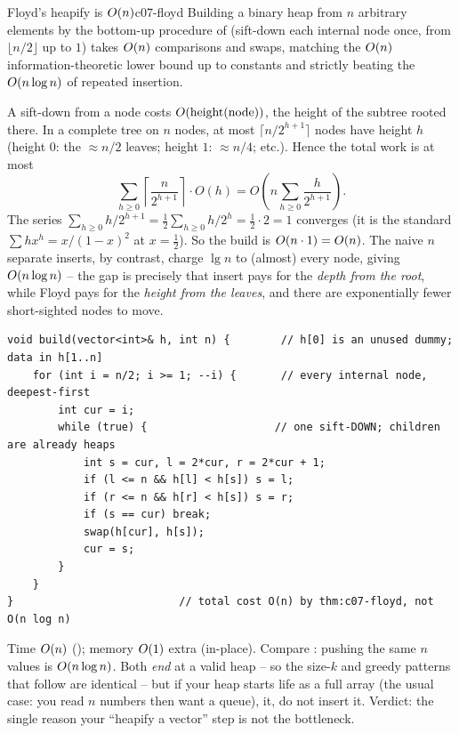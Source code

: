 \begin{theorem}{Floyd's heapify is $O(n)$}{c07-floyd}
Building a binary heap from $n$ arbitrary elements by the bottom-up procedure of 
(sift-down each internal node once, from $\lfloor n/2\rfloor$ up to $1$) takes $O(n)$ comparisons and
swaps, matching the $O(n)$ information-theoretic lower bound up to constants and strictly beating the
$O(n\log n)$ of repeated insertion.
\end{theorem}
\begin{proofbox}
A sift-down from a node costs $O(\operatorname{height}(\text{node}))$, the height of the subtree rooted there. In a
complete tree on $n$ nodes, at most $\lceil n/2^{h+1}\rceil$ nodes have height $h$ (height $0$: the $\approx
n/2$ leaves; height $1$: $\approx n/4$; etc.). Hence the total work is at most
\[ \sum_{h\ge 0} \left\lceil \frac{n}{2^{h+1}} \right\rceil \cdot O(h)
   = O\!\left( n \sum_{h\ge 0} \frac{h}{2^{h+1}} \right). \]
The series $\sum_{h\ge0} h/2^{h+1} = \tfrac12\sum_{h\ge0} h/2^{h} = \tfrac12 \cdot 2 = 1$ converges (it is
the standard $\sum h x^{h} = x/(1-x)^2$ at $x=\tfrac12$). So the build is $O(n\cdot 1)=O(n)$. The
naive $n$ separate inserts, by contrast, charge $\lg n$ to (almost) every node, giving $O(n\log n)$ --
the gap is precisely that insert pays for the \emph{depth from the root}, while Floyd pays for the
\emph{height from the leaves}, and there are exponentially fewer short-sighted nodes to move. \end{proofbox}

\begin{lstlisting}[caption={Floyd's linear-time bottom-up heapify of \texttt{h[1..n]} (min-heap)}, label={lst:c07-build}]
void build(vector<int>& h, int n) {        // h[0] is an unused dummy; data in h[1..n]
    for (int i = n/2; i >= 1; --i) {       // every internal node, deepest-first
        int cur = i;
        while (true) {                    // one sift-DOWN; children are already heaps
            int s = cur, l = 2*cur, r = 2*cur + 1;
            if (l <= n && h[l] < h[s]) s = l;
            if (r <= n && h[r] < h[s]) s = r;
            if (s == cur) break;
            swap(h[cur], h[s]);
            cur = s;
        }
    }
}                          // total cost O(n) by thm:c07-floyd, not O(n log n)
\end{lstlisting}

\begin{complexitybox}
Time $O(n)$ (); memory $O(1)$ extra (in-place). Compare :
pushing the same $n$ values is $O(n\log n)$. Both \emph{end} at a valid heap -- so the size-$k$ and
greedy patterns that follow are identical -- but if your heap starts life as a full array (the usual case:
you read $n$ numbers then want a queue),  it, do not insert it. Verdict: the single reason your
``heapify a vector'' step is not the bottleneck.
\end{complexitybox}

